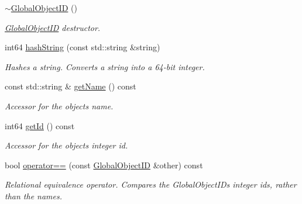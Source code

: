 \begin{DoxyCompactItemize}
\mbox{\label{class_arcana_1_1_global_object_i_d_a37b662e8d38746d0c7e9b71a25fa5937}} 
\mbox{\hyperlink{class_arcana_1_1_global_object_i_d_a37b662e8d38746d0c7e9b71a25fa5937}{$\sim$\+Global\+Object\+ID}} ()
\begin{DoxyCompactList}\small\item\em \mbox{\hyperlink{class_arcana_1_1_global_object_i_d}{Global\+Object\+ID}} destructor. \end{DoxyCompactList}\item 
\mbox{\label{class_arcana_1_1_global_object_i_d_a5cfa274ebc29b062146c502ff465abd5}} 
int64 \mbox{\hyperlink{class_arcana_1_1_global_object_i_d_a5cfa274ebc29b062146c502ff465abd5}{hash\+String}} (const std\+::string \&string)
\begin{DoxyCompactList}\small\item\em Hashes a string. Converts a string into a 64-\/bit integer. \end{DoxyCompactList}\item 
\mbox{\label{class_arcana_1_1_global_object_i_d_a7288b8c074f8e223befa23feefe49f26}} 
const std\+::string \& \mbox{\hyperlink{class_arcana_1_1_global_object_i_d_a7288b8c074f8e223befa23feefe49f26}{get\+Name}} () const
\begin{DoxyCompactList}\small\item\em Accessor for the object\textquotesingle{}s name. \end{DoxyCompactList}\item 
\mbox{\label{class_arcana_1_1_global_object_i_d_a045bc497b915b4c5ca87601664f08baf}} 
int64 \mbox{\hyperlink{class_arcana_1_1_global_object_i_d_a045bc497b915b4c5ca87601664f08baf}{get\+Id}} () const
\begin{DoxyCompactList}\small\item\em Accessor for the object\textquotesingle{}s integer id. \end{DoxyCompactList}\item 
\mbox{\label{class_arcana_1_1_global_object_i_d_a9ef5aba9aa2aa290ac8eb57683135f55}} 
bool \mbox{\hyperlink{class_arcana_1_1_global_object_i_d_a9ef5aba9aa2aa290ac8eb57683135f55}{operator==}} (const \mbox{\hyperlink{class_arcana_1_1_global_object_i_d}{Global\+Object\+ID}} \&other) const
\begin{DoxyCompactList}\small\item\em Relational equivalence operator. Compares the Global\+Object\+I\+Ds\textquotesingle{} integer ids, rather than the names. \end{DoxyCompactList}\end{DoxyCompactItemize}


